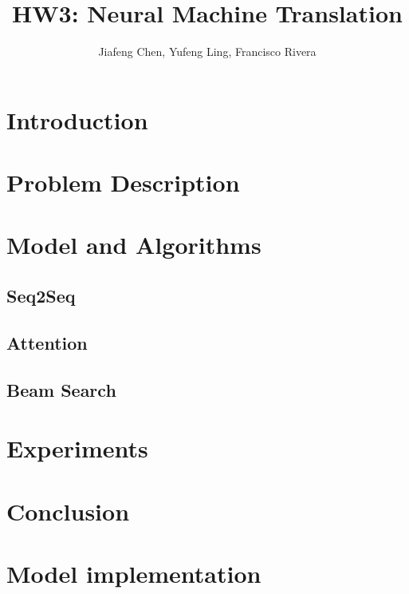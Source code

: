 \documentclass[12pt]{article}
\title{HW3: Neural Machine Translation}
\author{Jiafeng Chen, Yufeng Ling, Francisco Rivera}
\begin{document}
\maketitle{}
\section{Introduction}

\section{Problem Description}

\section{Model and Algorithms}

\subsection{Seq2Seq}
\label{sub:seq2seq}

\subsection{Attention}
\label{sub:attn}

\subsection{Beam Search}
\label{sub:beam}


\section{Experiments}

\section{Conclusion}





\appendix
\section{Model implementation}

% 
\end{document}
